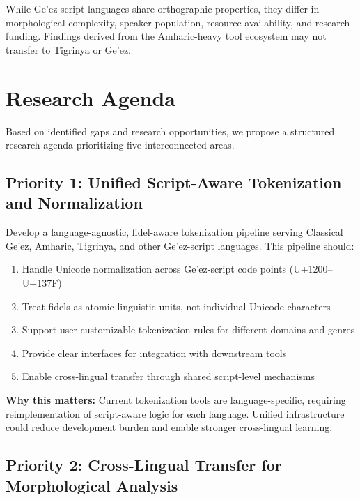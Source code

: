 \documentclass[12pt,a4paper]{article}
\theoremstyle{plain}
\theoremstyle{definition}
\begin{document}
While Ge'ez-script languages share orthographic properties, they differ in morphological complexity, speaker population, resource availability, and research funding. Findings derived from the Amharic-heavy tool ecosystem may not transfer to Tigrinya or Ge'ez.


\section{Research Agenda}
\label{sec:agenda}

Based on identified gaps and research opportunities, we propose a structured research agenda prioritizing five interconnected areas.

\subsection{Priority 1: Unified Script-Aware Tokenization and Normalization}

Develop a language-agnostic, fidel-aware tokenization pipeline serving Classical Ge'ez, Amharic, Tigrinya, and other Ge'ez-script languages. This pipeline should:

\begin{enumerate}
\item Handle Unicode normalization across Ge'ez-script code points (U+1200--U+137F)
\item Treat fidels as atomic linguistic units, not individual Unicode characters
\item Support user-customizable tokenization rules for different domains and genres
\item Provide clear interfaces for integration with downstream tools
\item Enable cross-lingual transfer through shared script-level mechanisms
\end{enumerate}

\textbf{Why this matters:} Current tokenization tools are language-specific, requiring reimplementation of script-aware logic for each language. Unified infrastructure could reduce development burden and enable stronger cross-lingual learning.

\subsection{Priority 2: Cross-Lingual Transfer for Morphological Analysis}
\end{document}
